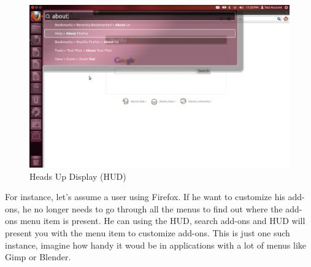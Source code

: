 \begin{figure}[h]	
	\begin{center}
	\includegraphics[width=400pt]{./images/desktop/HUD-firefox.png}
	\caption{Heads Up Display (HUD)}	
	\label{fig:unity-hud}	
	\end{center}
\end{figure}

\par \noindent For instance, let's assume a user using Firefox. If he want to customize his add-ons, he no longer needs to go through all the menus to find out where the add-ons menu item is present. He can using the HUD, search add-ons and HUD will present you with the menu item to customize add-ons. This is just one such instance, imagine how handy it woud be in applications with a lot of menus like Gimp or Blender.



